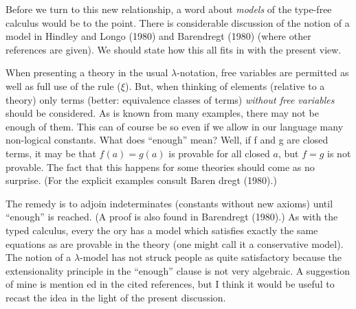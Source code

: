 \documentclass[12pt]{article}
\def\l{\lambda}
\begin{document}
Before we turn to this new relationship, a word about {\it models} of the type-free calculus would be to the point. There is considerable discussion of the notion of a model in Hindley and Longo (1980) and Barendregt (1980) (where other references are given). We should state how this all fits in with the present view.

When presenting a theory in the usual $\l$-notation, free variables are permitted as well as full use of the rule ($\xi$). But, when thinking of elements (relative to a theory) only terms (better: equivalence classes of terms) {\it without free variables} should be considered. As is known from many examples, there may not be enough of them. This can of course be so even if we
allow in our language many non-logical constants. What does
``enough'' mean? Well, if f and g are closed terms, it may be
that $f(a) = g(a)$ is provable for all closed $a$, but $f = g$ is not provable. The fact that this happens for some theories should come as no surprise. (For the explicit examples consult Baren dregt (1980).)

The remedy is to adjoin indeterminates (constants without
new axioms) until ``enough'' is reached. (A proof is also found
in Barendregt (1980).) As with the typed calculus, every the ory has a model which satisfies exactly the same equations as
are provable in the theory (one might call it a conservative
model).
The notion of a $\l$-model has not struck people as quite satisfactory because the extensionality principle in the ``enough'' clause is not very algebraic. A suggestion of mine is mention ed in the cited references, but I think it would be useful to recast the idea in the light of the present discussion.
\end{document}
